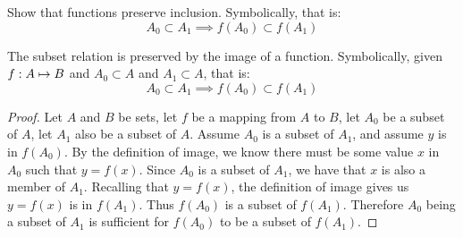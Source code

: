 \documentclass[main.tex]{subfiles}
\begin{document}
\subproblem{}\label{s2p2e}

Show that functions preserve inclusion. Symbolically, that is:
\[A_0 \subset A_1 \implies f(A_0) \subset f(A_1)\]

\begin{thm}
	The subset relation is preserved by the image of a function.
	Symbolically, given \({f}: {A} \mapsto{} {B}\) and \(A_0 \subset A\) and
	\(A_1 \subset A\), that is:
	\[A_0 \subset A_1 \implies f(A_0) \subset f(A_1)\]
\end{thm}
\begin{proof}
	Let \(A\) and \(B\) be sets, let \(f\) be a mapping from \(A\) to \(B\),
	let \(A_0\) be a subset of \(A\), let \(A_1\) also be a subset of \(A\).
	Assume \(A_0\) is a subset of \(A_1\), and assume \(y\) is in
	\(f(A_0)\). By the definition of image, we know there must be some value
	\(x\) in \(A_0\) such that \(y = f(x)\). Since \(A_0\) is a subset of
	\(A_1\), we have that \(x\) is also a member of \(A_1\). Recalling that
	\(y = f(x)\), the definition of image gives us \(y = f(x)\) is in
	\(f(A_1)\). Thus \(f(A_0)\) is a subset of \(f(A_1)\). Therefore \(A_0\)
	being a subset of \(A_1\) is sufficient for \(f(A_0)\) to be a subset of
	\(f(A_1)\).
\end{proof}
\end{document}
